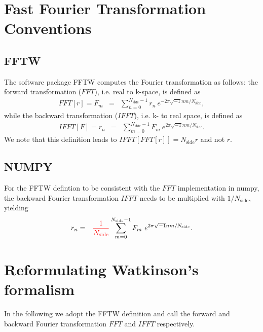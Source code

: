 \documentclass[twoside,10pt]{article}
\begin{document}
\begin{multicols}{2} %

\section{Fast Fourier Transformation Conventions}

\subsection{FFTW}

The software package {\sc FFTW} computes the Fourier transformation as follows: the forward transformation ($FFT$), i.e. real to k-space, is defined as
\begin{eqnarray}
 FFT[r] = F_m &=& \sum_{n=0}^{N_\mathrm{side}-1} r_n\ e^{-2\pi \sqrt{-1} n m  / N_\mathrm{side}},
\end{eqnarray}
while the backward transformation ($IFFT$), i.e. k- to real space, is defined as
\begin{eqnarray}
 IFFT[F] = r_n &=& \sum_{m=0}^{N_\mathrm{side}-1} F_m\ e^{2\pi \sqrt{-1} n m / N_\mathrm{side}}.
\end{eqnarray}
We note that this definition leads to $IFFT[FFT[r]] = N_\mathrm{side} r$ and not $r$.

\subsection{NUMPY}

For the {\sc FFTW} defintion to be consistent with the $FFT$ implementation in {\sc numpy}, the backward Fourier transformation $IFFT$ needs to be multiplied with $1/N_\mathrm{side}$, yielding
\begin{eqnarray}
 r_n &=&  \textcolor{red}{\frac{1}{N_\mathrm{side}}} \sum_{m=0}^{N_\mathrm{side}-1} F_m\ e^{2\pi \sqrt{-1} n m / N_\mathrm{side}}.
\end{eqnarray}

\section{Reformulating Watkinson's formalism}

In the following we adopt the {\sc FFTW} definition and call the forward and backward Fourier transformation $FFT$ and $IFFT$ respectively.


\end{multicols}
\end{document}
